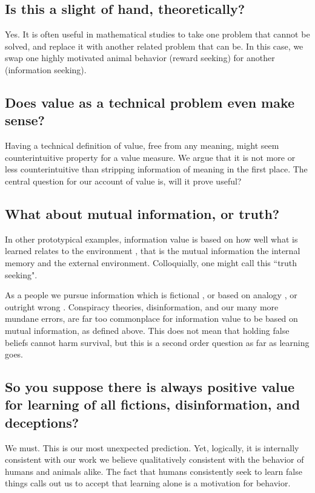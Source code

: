 \subsection*{Is this a slight of hand, theoretically?}
Yes. It is often useful in mathematical studies to take one problem that cannot be solved, and replace it with another related problem that can be. In this case, we swap one highly motivated animal behavior (reward seeking) for another (information seeking).


\subsection*{Does value as a technical problem even make sense?}
Having a technical definition of value, free from any meaning, might seem counterintuitive property for a value measure. We argue that it is not more or less counterintuitive than stripping information of meaning in the first  place. The central question for our account of value is, will it prove useful? 


\subsection*{What about mutual information, or truth?}
In other prototypical examples, information value is based on how well what is learned relates to the environment \cite{Behrens2007,Kolchinsky2018,Tishby2000}, that is the mutual information the internal memory and the external environment. Colloquially, one might call this ``truth seeking". 

As a people we pursue information which is fictional \cite{sternisko2020dark}, or based on analogy \cite{gentner1997reasoning}, or outright wrong \cite{loftus1989misinformation}. Conspiracy theories, disinformation, and our many more mundane errors, are far too commonplace for information value to be based on mutual information, as defined above. This does not mean that holding false beliefs cannot harm survival, but this is a second order question as far as learning goes. 


\subsection*{So you suppose there is always positive value for learning of all fictions, disinformation, and deceptions?}
We must. This is our most unexpected prediction. Yet, logically, it is internally consistent with our work we believe qualitatively consistent with the behavior of humans and animals alike. The fact that humans consistently seek to learn false things calls out us to accept that learning alone is a motivation for behavior.


